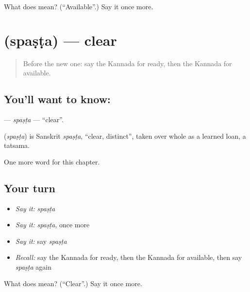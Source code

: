 \begin{tcolorbox}[breakable,colback=teal!4,colframe=teal!35!black,title={Before you move on}]
What does  mean? (\textquotedblleft{}Available\textquotedblright{}.) Say it once more.
\end{tcolorbox}
\section[\texorpdfstring{\kn{ಸ್ಪಷ್ಟ} (spaṣṭa)}{ಸ್ಪಷ್ಟ (spaṣṭa)}]{ (spaṣṭa) — clear}

\label{lesson:KA-C218-spasta}



\begin{quote}
Before the new one: say the Kannada for ready, then the Kannada for available.
\end{quote}

\subsection*{You'll want to know: }
\textbf{} — \emph{spaṣṭa} — \textquotedblleft{}clear\textquotedblright{}.

\begin{cousinweb}
\textbf{} (\emph{spaṣṭa}) is Sanskrit \emph{spaṣṭa}, \textquotedblleft{}clear, distinct\textquotedblright{}, taken over whole as a learned loan, a tatsama.
\end{cousinweb}

\begin{grammarlens}[title={What you've built}]
One more word for this chapter.
\end{grammarlens}

\subsection*{Your turn}
\begin{itemize}
\raggedright
  \item \emph{Say it:} \emph{spaṣṭa}
  \item \emph{Say it:} \emph{spaṣṭa}, once more
  \item \emph{Say it:} say \emph{spaṣṭa}
  \item \emph{Recall:} say the Kannada for ready, then the Kannada for available, then say \emph{spaṣṭa} again
\end{itemize}

\begin{tcolorbox}[breakable,colback=teal!4,colframe=teal!35!black,title={Before you move on}]
What does  mean? (\textquotedblleft{}Clear\textquotedblright{}.) Say it once more.
\end{tcolorbox}
